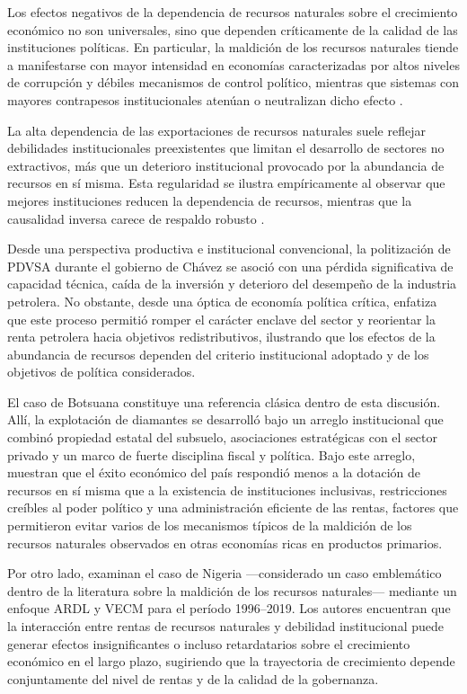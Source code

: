 \documentclass[../../PTFM.tex]{subfiles}
\begin{document}
	Los efectos negativos de la dependencia de recursos naturales sobre el crecimiento económico no son universales, sino que dependen críticamente de la calidad de las instituciones políticas. En particular, la maldición de los recursos naturales tiende a manifestarse con mayor intensidad en economías caracterizadas por altos niveles de corrupción y débiles mecanismos de control político, mientras que sistemas con mayores contrapesos institucionales atenúan o neutralizan dicho efecto \parencite{Brckner2010}.
	
	La alta dependencia de las exportaciones de recursos naturales suele reflejar debilidades institucionales preexistentes que limitan el desarrollo de sectores no extractivos, más que un deterioro institucional provocado por la abundancia de recursos en sí misma. Esta regularidad se ilustra empíricamente al observar que mejores instituciones reducen la dependencia de recursos, mientras que la causalidad inversa carece de respaldo robusto \parencite{Brunnschweiler2008}.
	
	Desde una perspectiva productiva e institucional convencional, la politización de PDVSA durante el gobierno de Chávez se asoció con una pérdida significativa de capacidad técnica, caída de la inversión y deterioro del desempeño de la industria petrolera. No obstante, desde una óptica de economía política crítica, \textcite{Hammond2011} enfatiza que este proceso permitió romper el carácter enclave del sector y reorientar la renta petrolera hacia objetivos redistributivos, ilustrando que los efectos de la abundancia de recursos dependen del criterio institucional adoptado y de los objetivos de política considerados.
	
	El caso de Botsuana constituye una referencia clásica dentro de esta discusión. Allí, la explotación de diamantes se desarrolló bajo un arreglo institucional que combinó propiedad estatal del subsuelo, asociaciones estratégicas con el sector privado y un marco de fuerte disciplina fiscal y política. Bajo este arreglo, \textcite{Acemoglu2001} muestran que el éxito económico del país respondió menos a la dotación de recursos en sí misma que a la existencia de instituciones inclusivas, restricciones creíbles al poder político y una administración eficiente de las rentas, factores que permitieron evitar varios de los mecanismos típicos de la maldición de los recursos naturales observados en otras economías ricas en productos primarios.
	
	Por otro lado, \textcite{Fagbemi2022} examinan el caso de Nigeria —considerado un caso emblemático dentro de la literatura sobre la maldición de los recursos naturales— mediante un enfoque ARDL y VECM para el período 1996–2019. Los autores encuentran que la interacción entre rentas de recursos naturales y debilidad institucional puede generar efectos insignificantes o incluso retardatarios sobre el crecimiento económico en el largo plazo, sugiriendo que la trayectoria de crecimiento depende conjuntamente del nivel de rentas y de la calidad de la gobernanza.
	
\end{document}
